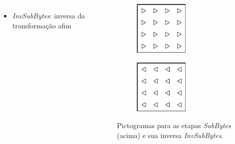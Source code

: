 \documentclass[12pt]{beamer}
\begin{document}
\begin{frame}
\begin{columns}[T]
\begin{column}{.7\textwidth}
\begin{itemize}
\begin{equation*}
          \end{equation*}
        \item \emph{InvSubBytes}: inversa da transformação afim
      \end{itemize}
    \end{column}
    \begin{column}{.25\textwidth}
      \begin{figure}
        \centering
        \begin{subfigure}[b]{0.7\textwidth}
          \includegraphics{img/sub_bytes_fwd.pdf}
          \vspace{2mm}
        \end{subfigure}

        \begin{subfigure}[b]{0.7\textwidth}
          \includegraphics{img/sub_bytes_inv.pdf}
        \end{subfigure}

        \captionsetup{font=scriptsize}
        \caption*{Pictogramas para as etapas \emph{SubBytes} (acima) e sua
          inversa \emph{InvSubBytes}.}
      \end{figure}
    \end{column}
  \end{columns}
\end{frame}
\end{document}
